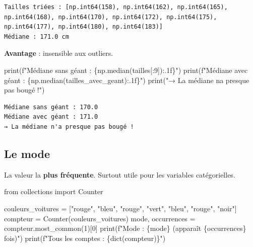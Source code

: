 \documentclass[
  french,
  11pt,
  a4paper,
]{scrbook}
\newenvironment{Shaded}{}{}
\newcommand{\BuiltInTok}[1]{\textcolor[rgb]{0.84,0.23,0.29}{#1}}
\newcommand{\DecValTok}[1]{\textcolor[rgb]{0.00,0.36,0.77}{#1}}
\newcommand{\ImportTok}[1]{\textcolor[rgb]{0.01,0.18,0.38}{#1}}
\newcommand{\NormalTok}[1]{\textcolor[rgb]{0.14,0.16,0.18}{#1}}
\newcommand{\OperatorTok}[1]{\textcolor[rgb]{0.14,0.16,0.18}{#1}}
\newcommand{\SpecialCharTok}[1]{\textcolor[rgb]{0.00,0.36,0.77}{#1}}
\newcommand{\SpecialStringTok}[1]{\textcolor[rgb]{0.01,0.18,0.38}{#1}}
\newcommand{\StringTok}[1]{\textcolor[rgb]{0.01,0.18,0.38}{#1}}
\begin{document}
\begin{verbatim}
Tailles triées : [np.int64(158), np.int64(162), np.int64(165), np.int64(168), np.int64(170), np.int64(172), np.int64(175), np.int64(177), np.int64(180), np.int64(183)]
Médiane : 171.0 cm
\end{verbatim}

\textbf{Avantage} : insensible aux outliers.

\begin{Shaded}
\begin{Highlighting}[]
\BuiltInTok{print}\NormalTok{(}\SpecialStringTok{f"Médiane sans géant : }\SpecialCharTok{\{}\NormalTok{np}\SpecialCharTok{.}\NormalTok{median(tailles[:}\DecValTok{9}\NormalTok{])}\SpecialCharTok{:.1f\}}\SpecialStringTok{"}\NormalTok{)}
\BuiltInTok{print}\NormalTok{(}\SpecialStringTok{f"Médiane avec géant : }\SpecialCharTok{\{}\NormalTok{np}\SpecialCharTok{.}\NormalTok{median(tailles\_avec\_geant)}\SpecialCharTok{:.1f\}}\SpecialStringTok{"}\NormalTok{)}
\BuiltInTok{print}\NormalTok{(}\StringTok{"→ La médiane n\textquotesingle{}a presque pas bougé !"}\NormalTok{)}
\end{Highlighting}
\end{Shaded}

\begin{verbatim}
Médiane sans géant : 170.0
Médiane avec géant : 171.0
→ La médiane n'a presque pas bougé !
\end{verbatim}

\subsection{Le mode}\label{le-mode}

La valeur la \textbf{plus fréquente}. Surtout utile pour les variables
catégorielles.

\begin{Shaded}
\begin{Highlighting}[]
\ImportTok{from}\NormalTok{ collections }\ImportTok{import}\NormalTok{ Counter}

\NormalTok{couleurs\_voitures }\OperatorTok{=}\NormalTok{ [}\StringTok{"rouge"}\NormalTok{, }\StringTok{"bleu"}\NormalTok{, }\StringTok{"rouge"}\NormalTok{, }\StringTok{"vert"}\NormalTok{, }\StringTok{"bleu"}\NormalTok{, }\StringTok{"rouge"}\NormalTok{, }\StringTok{"noir"}\NormalTok{]}
\NormalTok{compteur }\OperatorTok{=}\NormalTok{ Counter(couleurs\_voitures)}
\NormalTok{mode, occurrences }\OperatorTok{=}\NormalTok{ compteur.most\_common(}\DecValTok{1}\NormalTok{)[}\DecValTok{0}\NormalTok{]}
\BuiltInTok{print}\NormalTok{(}\SpecialStringTok{f"Mode : \textquotesingle{}}\SpecialCharTok{\{}\NormalTok{mode}\SpecialCharTok{\}}\SpecialStringTok{\textquotesingle{} (apparaît }\SpecialCharTok{\{}\NormalTok{occurrences}\SpecialCharTok{\}}\SpecialStringTok{ fois)"}\NormalTok{)}
\BuiltInTok{print}\NormalTok{(}\SpecialStringTok{f"Tous les comptes : }\SpecialCharTok{\{}\BuiltInTok{dict}\NormalTok{(compteur)}\SpecialCharTok{\}}\SpecialStringTok{"}\NormalTok{)}
\end{Highlighting}
\end{Shaded}
\end{document}
